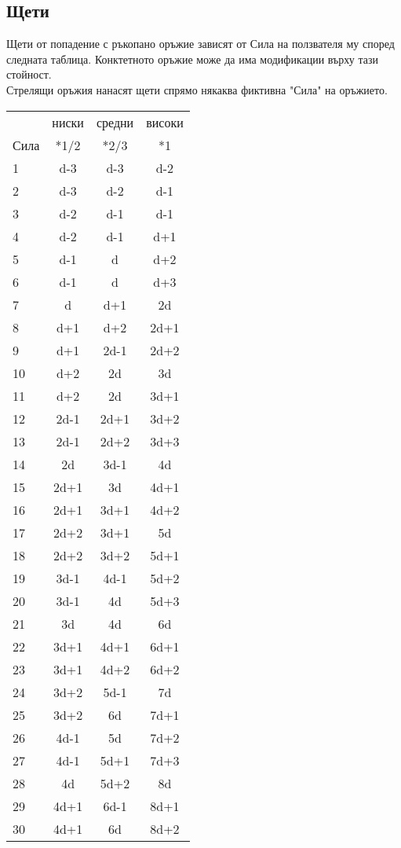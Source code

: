 \begin{footnotesize}
\begin{multicols}{2}
\subsection{Щети}
Щети от попадение с ръкопано оръжие зависят от Сила на ползвателя му според следната таблица.
Конктетното оръжие може да има модификации върху тази стойност.
\\
Стрелящи оръжия нанасят щети спрямо някаква фиктивна "Сила" на оръжието.
\\
\begin{tabular}{l | c | c | c}
     & ниски & средни & високи  \\
Сила & *1/2  & *2/3   & *1      \\
1  & d-3  & d-3  & d-2   \\
2  & d-3  & d-2  & d-1   \\
3  & d-2  & d-1  & d-1   \\
4  & d-2  & d-1  & d+1   \\
5  & d-1  & d    & d+2   \\
6  & d-1  & d    & d+3   \\
7  & d    & d+1  & 2d    \\
8  & d+1  & d+2  & 2d+1  \\
9  & d+1  & 2d-1 & 2d+2  \\
10 & d+2  & 2d   & 3d    \\
11 & d+2  & 2d   & 3d+1  \\
12 & 2d-1 & 2d+1 & 3d+2  \\
13 & 2d-1 & 2d+2 & 3d+3  \\
14 & 2d   & 3d-1 & 4d    \\
15 & 2d+1 & 3d   & 4d+1  \\
16 & 2d+1 & 3d+1 & 4d+2  \\
17 & 2d+2 & 3d+1 & 5d    \\
18 & 2d+2 & 3d+2 & 5d+1  \\
19 & 3d-1 & 4d-1 & 5d+2  \\
20 & 3d-1 & 4d   & 5d+3  \\
21 & 3d   & 4d   & 6d    \\
22 & 3d+1 & 4d+1 & 6d+1  \\
23 & 3d+1 & 4d+2 & 6d+2  \\
24 & 3d+2 & 5d-1 & 7d    \\
25 & 3d+2 & 6d   & 7d+1  \\
26 & 4d-1 & 5d   & 7d+2  \\
27 & 4d-1 & 5d+1 & 7d+3  \\
28 & 4d   & 5d+2 & 8d    \\
29 & 4d+1 & 6d-1 & 8d+1  \\
30 & 4d+1 & 6d   & 8d+2
\end{tabular}



\end{multicols}
\end{footnotesize}
